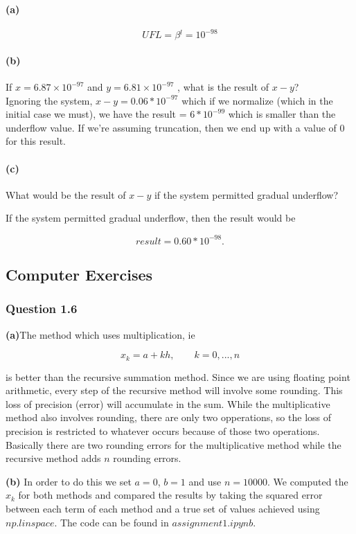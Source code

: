 \documentclass{article}
\begin{document}
\paragraph{(a)}
$$UFL = \beta{}^{l} = 10 ^{-98}$$

\paragraph{(b)} If $x = 6.87 × 10^{-97}$ and $y = 6.81 × 10^{-97}$ ,
what is the result of $x - y$?\\

Ignoring the system, $x - y = 0.06 * 10 ^{-97}$ which if we normalize (which in 
the initial case we must), we have the result = $6*10^{-99}$ which is smaller than 
the underflow value. If we're assuming truncation, then we end up with a value of 
0 for this result.



\paragraph{(c)}What would be the result of $x - y$ if the
system permitted gradual underflow?

If the system permitted gradual underflow, then the result would be

$$result= 0.60 * 10^{-98}.$$


\subsection{Computer Exercises}
\subsubsection{Question 1.6}

\textbf{(a)}The method which uses multiplication, ie

$$x_k = a + kh, \qquad k=0,...,n$$

is better than the recursive summation method. Since we are using floating
point arithmetic, every step of the recursive method will involve some rounding. 
This loss of precision (error) will accumulate in the sum. While the 
multiplicative method also involves rounding, there are only two opperations, so 
the loss of precision is restricted to whatever occurs because of those two 
operations. Basically there are two rounding errors for the multiplicative method 
while the recursive method adds $n$ rounding errors.

\textbf{(b)}
In order to do this we set $a=0$, $b=1$ and use $n=10000$. We computed the $x_k$ 
for both methods and compared the results by taking the squared error between each 
term of each method and a true set of values achieved using $np.linspace$. The 
code can be found in $assignment1.ipynb.$\\
\end{document}
